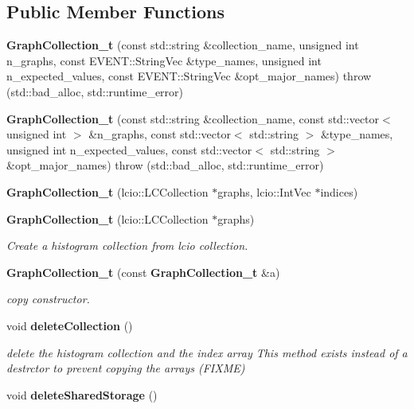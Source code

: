 \subsection*{Public Member Functions}
\begin{DoxyCompactItemize}
\item 
{\bfseries GraphCollection\_\-t} (const std::string \&collection\_\-name, unsigned int n\_\-graphs, const EVENT::StringVec \&type\_\-names, unsigned int n\_\-expected\_\-values, const EVENT::StringVec \&opt\_\-major\_\-names)  throw (std::bad\_\-alloc, std::runtime\_\-error)\label{classhistmgr_1_1GraphCollection__t_ac8a65ff881a2bcd7831a5eaaab485a7d}

\item 
{\bfseries GraphCollection\_\-t} (const std::string \&collection\_\-name, const std::vector$<$ unsigned int $>$ \&n\_\-graphs, const std::vector$<$ std::string $>$ \&type\_\-names, unsigned int n\_\-expected\_\-values, const std::vector$<$ std::string $>$ \&opt\_\-major\_\-names)  throw (std::bad\_\-alloc, std::runtime\_\-error)\label{classhistmgr_1_1GraphCollection__t_a333affcaa9a51f0c6fb31512a6a7ba24}

\item 
{\bf GraphCollection\_\-t} (lcio::LCCollection $\ast$graphs, lcio::IntVec $\ast$indices)
\item 
{\bf GraphCollection\_\-t} (lcio::LCCollection $\ast$graphs)
\begin{DoxyCompactList}\small\item\em Create a histogram collection from lcio collection. \item\end{DoxyCompactList}\item 
{\bf GraphCollection\_\-t} (const {\bf GraphCollection\_\-t} \&a)\label{classhistmgr_1_1GraphCollection__t_a8beca08f62d11c86c76e861678e0a256}

\begin{DoxyCompactList}\small\item\em copy constructor. \item\end{DoxyCompactList}\item 
void {\bf deleteCollection} ()\label{classhistmgr_1_1GraphCollection__t_a9e80261bb734fb1f63480aee46764ffe}

\begin{DoxyCompactList}\small\item\em delete the histogram collection and the index array This method exists instead of a destrctor to prevent copying the arrays (FIXME) \item\end{DoxyCompactList}\item 
void {\bfseries deleteSharedStorage} ()\label{classhistmgr_1_1GraphCollection__t_aa3c1de2ff8e58f55dd92b68ce42d0535}


\end{DoxyCompactItemize}
